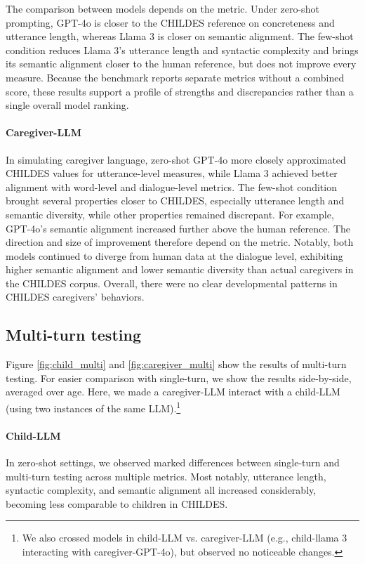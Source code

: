 The comparison between models depends on the metric. Under zero-shot prompting, GPT-4o is closer to the CHILDES reference on concreteness and utterance length, whereas Llama 3 is closer on semantic alignment. The few-shot condition reduces Llama 3's utterance length and syntactic complexity and brings its semantic alignment closer to the human reference, but does not improve every measure. Because the benchmark reports separate metrics without a combined score, these results support a profile of strengths and discrepancies rather than a single overall model ranking.



\paragraph{Caregiver-LLM} In simulating caregiver language, zero-shot GPT-4o more closely approximated CHILDES values for utterance-level measures, while Llama 3 achieved better alignment with word-level and dialogue-level metrics. The few-shot condition brought several properties closer to CHILDES, especially utterance length and semantic diversity, while other properties remained discrepant. For example, GPT-4o's semantic alignment increased further above the human reference. The direction and size of improvement therefore depend on the metric. Notably, both models continued to diverge from human data at the dialogue level, exhibiting higher semantic alignment and lower semantic diversity than actual caregivers in the CHILDES corpus. Overall, there were no clear developmental patterns in CHILDES caregivers' behaviors.





\subsection{Multi-turn testing}

Figure \ref{fig:child_multi} and \ref{fig:caregiver_multi} show the results of multi-turn testing. For easier comparison with single-turn, we show the results side-by-side, averaged over age. Here, we made a caregiver-LLM interact with a child-LLM (using two instances of the same LLM).\footnote{We also crossed models in child-LLM vs. caregiver-LLM (e.g., child-llama 3 interacting with caregiver-GPT-4o), but observed no noticeable changes.}


\paragraph{Child-LLM} In zero-shot settings, we observed marked differences between single-turn and multi-turn testing across multiple metrics. Most notably, utterance length, syntactic complexity, and semantic alignment all increased considerably, becoming less comparable to children in CHILDES. 



